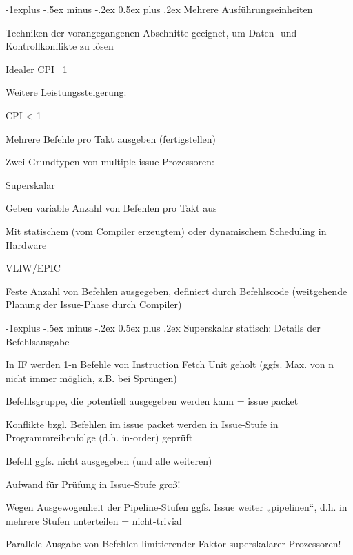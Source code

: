 \documentclass[10pt,landscape]{article}
\makeatletter
\renewcommand{\subsection}{\@startsection{subsection}{2}{0mm}%
                                {-1explus -.5ex minus -.2ex}%
                                {0.5ex plus .2ex}%
                                {\normalfont\normalsize\bfseries}}
\makeatother
\begin{document}
\begin{multicols}{3}
  \subsection{ Mehrere Ausführungseinheiten}
  \begin{itemize*}
    \item Techniken der vorangegangenen Abschnitte geeignet, um Daten- und Kontrollkonflikte zu lösen
    \item Idealer CPI ~1
    \item Weitere Leistungssteigerung: 
    \item CPI < 1
    \item Mehrere Befehle pro Takt ausgeben (fertigstellen)
    \item Zwei Grundtypen von multiple-issue Prozessoren:
    \item Superskalar
    \item Geben variable Anzahl von Befehlen pro Takt aus
    \item Mit statischem (vom Compiler erzeugtem) oder dynamischem Scheduling in Hardware
    \item VLIW/EPIC
    \item Feste Anzahl von Befehlen ausgegeben, definiert durch Befehlscode (weitgehende Planung der Issue-Phase durch Compiler)
  \end{itemize*}
  
  
  \subsection{ Superskalar}
  statisch: Details der Befehlsausgabe
  \begin{itemize*}
    \item In IF werden 1-n Befehle von Instruction Fetch Unit geholt (ggfs. Max. von n nicht immer möglich, z.B. bei Sprüngen)
    \item Befehlsgruppe, die potentiell ausgegeben werden kann = issue packet
    \item Konflikte bzgl. Befehlen im issue packet werden in Issue-Stufe in Programmreihenfolge (d.h. in-order) geprüft
    \item Befehl ggfs. nicht ausgegeben (und alle weiteren)
    \item Aufwand für Prüfung in Issue-Stufe groß!
    \item Wegen Ausgewogenheit der Pipeline-Stufen ggfs. Issue weiter „pipelinen“, d.h. in mehrere Stufen unterteilen = nicht-trivial
    \item Parallele Ausgabe von Befehlen limitierender Faktor superskalarer Prozessoren!
  \end{itemize*}
  

\end{multicols}
\end{document}
